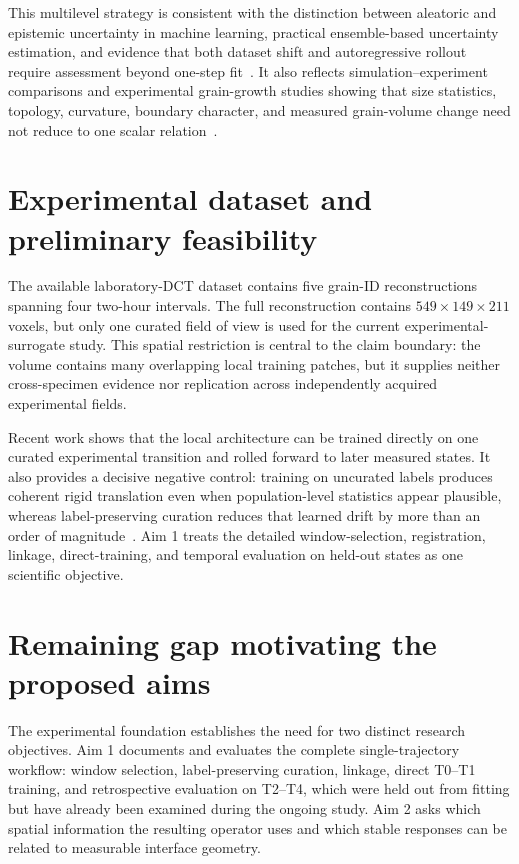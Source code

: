 \documentclass[proposalMode]{ufdissertation}
\begin{document}
This multilevel strategy is consistent with the distinction between aleatoric and epistemic uncertainty in machine learning, practical ensemble-based uncertainty estimation, and evidence that both dataset shift and autoregressive rollout require assessment beyond one-step fit~\cite{hullermeier2021uncertainty,lakshminarayanan2017ensembles,ovadia2019shift,mccabe2023stability}. It also reflects simulation--experiment comparisons and experimental grain-growth studies showing that size statistics, topology, curvature, boundary character, and measured grain-volume change need not reduce to one scalar relation~\cite{mckenna2014fourD,rowenhorst2010topology,martine2019metrics,bhattacharya2021curvature,peng2022comparison,rohrer2011anisotropy,han2018kinetics}.

\bigskip

\section{Experimental dataset and preliminary feasibility}

The available laboratory-DCT dataset contains five grain-ID reconstructions spanning four two-hour intervals. The full reconstruction contains \(549\times149\times211\) voxels, but only one curated field of view is used for the current experimental-surrogate study. This spatial restriction is central to the claim boundary: the volume contains many overlapping local training patches, but it supplies neither cross-specimen evidence nor replication across independently acquired experimental fields.

Recent work shows that the local architecture can be trained directly on one curated experimental transition and rolled forward to later measured states. It also provides a decisive negative control: training on uncurated labels produces coherent rigid translation even when population-level statistics appear plausible, whereas label-preserving curation reduces that learned drift by more than an order of magnitude~\cite{tian2026experiment}. Aim 1 treats the detailed window-selection, registration, linkage, direct-training, and temporal evaluation on held-out states as one scientific objective.

\section{Remaining gap motivating the proposed aims}

The experimental foundation establishes the need for two distinct research objectives. Aim 1 documents and evaluates the complete single-trajectory workflow: window selection, label-preserving curation, linkage, direct T0--T1 training, and retrospective evaluation on T2--T4, which were held out from fitting but have already been examined during the ongoing study. Aim 2 asks which spatial information the resulting operator uses and which stable responses can be related to measurable interface geometry.
\end{document}
